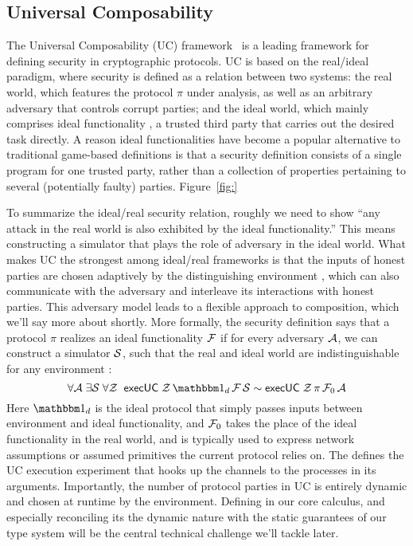 \subsection{Universal Composability}
The Universal Composability (UC) framework~\cite{uc} is a leading framework for defining security in cryptographic protocols.
UC is based on the real/ideal paradigm, where security is defined as a relation between two systems: the real world, which features the protocol $\pi$ under analysis, as well as an arbitrary adversary \A that controls corrupt parties; and the ideal world, which mainly comprises ideal functionality \F, a trusted third party that carries out the desired task directly.
A reason ideal functionalities have become a popular alternative to traditional game-based definitions is that a security definition consists of a single program for one trusted party, rather than a collection of properties pertaining to several (potentially faulty) parties.
Figure~\ref{fig:}

To summarize the ideal/real security relation, roughly we need to show ``any attack in the real world is also exhibited by the ideal functionality.'' This means constructing a simulator \Sim that plays the role of adversary in the ideal world.
What makes UC the strongest among ideal/real frameworks is that the inputs of honest parties are chosen adaptively by the distinguishing environment \Z, which can also communicate with the adversary and interleave its interactions with honest parties.
This adversary model leads to a flexible approach to composition, which we'll say more about shortly.
More formally, the security definition says that a protocol $\pi$ realizes an ideal functionality $\mathcal{F}$
if for every adversary $\mathcal{A}$, we can construct a simulator $\mathcal{S}$, such that the real and ideal world are indistinguishable for any environment \Z:
\begin{equation}
  \label{eqn:emulation}
  \forall \A \; \exists \Sim \; \forall \Z \; \; \msf{execUC} \; \Z \, \idealP \, \F \, \Sim \sim \msf{execUC} \; \Z \, \pi \, \F_0 \, \A
\end{equation}
Here $\idealP$ is the ideal protocol that simply passes inputs between environment and ideal functionality, and $\mathcal{F}_0$ takes the place of the ideal functionality in the real world, and is typically used to express network assumptions or assumed primitives the current protocol relies on.
The  defines the UC execution experiment that hooks up the channels to the processes in its arguments.
Importantly, the number of protocol parties in UC is entirely dynamic and chosen at runtime by the environment. 
Defining  in our core calculus, and especially reconciling its the dynamic nature with the static guarantees of our type system will be the central technical challenge we'll tackle later.

